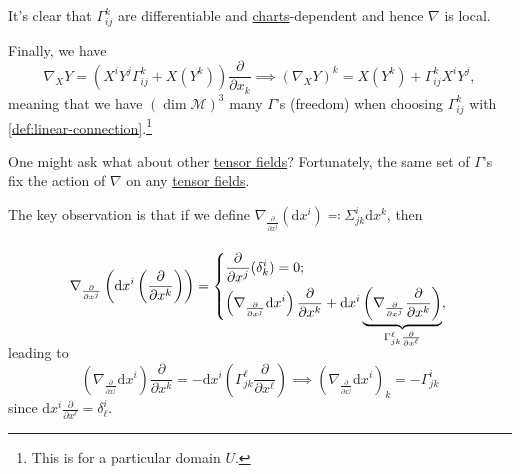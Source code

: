 \begin{note}
	It's clear that \(\Gamma ^k_{ij}\) are differentiable and \hyperref[def:coordinate-chart]{charts}-dependent and hence \(\nabla \) is local.
\end{note}

Finally, we have
\[
	\nabla _X Y = \left( X^i Y^j \Gamma ^k_{ij} + X(Y^k) \right) \frac{\partial }{\partial x_k}
	\implies (\nabla _X Y)^k = X(Y^k) + \Gamma ^k_{ij} X^i Y^j,
\]
meaning that we have \((\dim \mathcal{M} )^3\) many \(\Gamma\)'s (freedom) when choosing \(\Gamma ^k_{ij}\) with \autoref{def:linear-connection}.\footnote{This is for a particular domain \(U\).}

\begin{remark}
	One might ask what about other \hyperref[def:tensor-field]{tensor fields}? Fortunately, the same set of \(\Gamma \)'s fix the action of \(\nabla \) on any \hyperref[def:tensor-field]{tensor fields}.
\end{remark}
\begin{explanation}
	The key observation is that if we define \(\nabla _{\frac{\partial }{\partial x^j} } (\mathrm{d} x^i) \eqqcolon \Sigma ^i _{j k} \mathrm{d} x^k\), then
	\[
		\nabla _{\frac{\partial }{\partial x^j} } \left( \mathrm{d} x^i \left( \frac{\partial }{\partial x^k}  \right)  \right) =
		\begin{dcases}
			\frac{\partial }{\partial x^j} (\delta ^i_k) = 0; \\
			\vphantom{\left( \nabla _{\frac{\partial }{\partial x^j} } \mathrm{d} x^i\right) \frac{\partial }{\partial x^k} + \mathrm{d} x^i\left( \nabla _{\frac{\partial }{\partial x^j}} \frac{\partial }{\partial x^k} \right)}
			\smash{\left( \nabla _{\frac{\partial }{\partial x^j} } \mathrm{d} x^i\right) \frac{\partial }{\partial x^k}
			+ \mathrm{d} x^i \underbrace{\left( \nabla _{\frac{\partial }{\partial x^j}} \frac{\partial }{\partial x^k} \right)}_{\Gamma ^\ell _{jk} \frac{\partial }{\partial x^{\ell } }},}
		\end{dcases}
		\vphantom{\begin{dcases}
				\frac{\partial }{\partial x^j} (\delta ^i_k) = 0; \\
				\left( \nabla _{\frac{\partial }{\partial x^j} } \mathrm{d} x^i\right) \frac{\partial }{\partial x^k}
				+ \mathrm{d} x^i \underbrace{\left( \nabla _{\frac{\partial }{\partial x^j}} \frac{\partial }{\partial x^k} \right)}_{\Gamma ^\ell _{jk} \frac{\partial }{\partial x^{\ell } }}
			\end{dcases}}
	\]
	leading to
	\[
		\left( \nabla _{\frac{\partial }{\partial x^j} } \mathrm{d} x^i\right) \frac{\partial }{\partial x^k}
		= - \mathrm{d} x^i \left( \Gamma ^\ell _{jk} \frac{\partial }{\partial x^{\ell } }  \right)
		\implies \left( \nabla _{\frac{\partial }{\partial x^j} } \mathrm{d} x^i\right)_k
		= - \Gamma ^i _{jk}
	\]
	since \(\mathrm{d} x^i \frac{\partial }{\partial x^{\ell } } = \delta ^i_{\ell }\).
\end{explanation}

